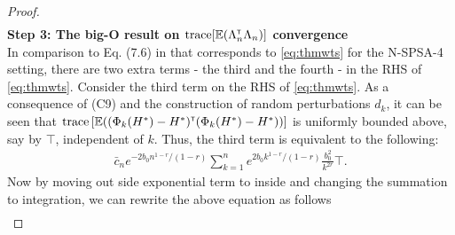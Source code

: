 \begin{proof}
\begin{align}
\end{align} 
%
\noindent\textbf{Step 3: The big-O result on $\text{trace}[\mathbb{E} (\Lambda_n ^\mathsf{\scriptscriptstyle T} \Lambda_n)]$ convergence} \\
In comparison to Eq. (7.6) in \cite{spall-jacobian} that corresponds to \eqref{eq:thmwts} for the N-SPSA-4 setting, there are two extra terms - the third and the fourth - in the RHS of \eqref{eq:thmwts}. 
Consider the third term on the RHS of \eqref{eq:thmwts}. As a consequence of (C9) and the construction of random perturbations $d_k$, it can be seen that $\text{trace}\left[\mathbb{E} ((\Phi_k(H^*) - H^*) ^\mathsf{\scriptscriptstyle T}  (\Phi_k(H^*) - H^*))\right]$ is uniformly bounded above, say by $\top$, independent of $k$. Thus, the third term is equivalent to the following:
\begin{align}
 \bar c_n e^{-2 b_0 n^{1-r}/(1-r)} \sum_{k=1}^n e^{2 b_0 k^{1-r}/(1-r)}  \frac{b_0^2}{k^{2 r}} \top.
\label{eq:term3}
\end{align}
Now by moving out side exponential term to inside and changing the summation to integration, we can rewrite the above equation as follows
\begin{align}

\end{align}
\end{proof}
